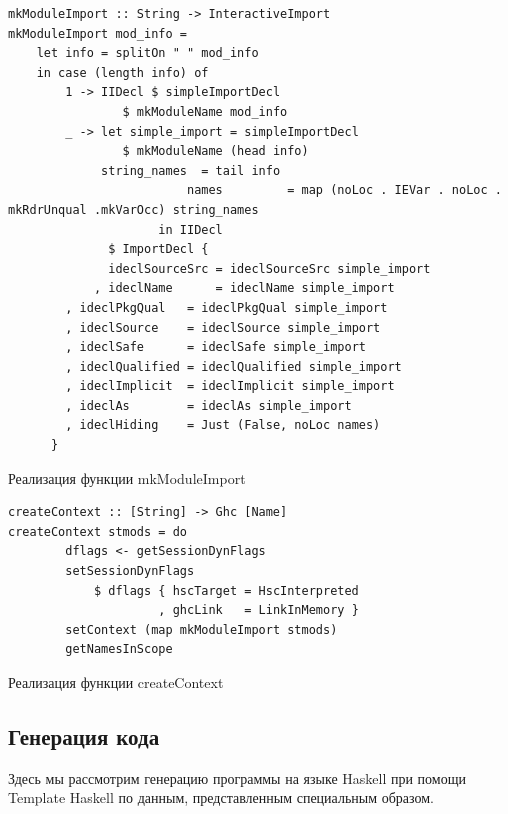		\begin{ListingEnv}[h]
		\begin{lstlisting}
mkModuleImport :: String -> InteractiveImport
mkModuleImport mod_info = 
	let info = splitOn " " mod_info
 	in case (length info) of
		1 -> IIDecl $ simpleImportDecl 
			    $ mkModuleName mod_info
		_ -> let simple_import = simpleImportDecl 
			    $ mkModuleName (head info)
			 string_names  = tail info
                         names         = map (noLoc . IEVar . noLoc . mkRdrUnqual .mkVarOcc) string_names
                     in IIDecl 
              $ ImportDecl { 
              ideclSourceSrc = ideclSourceSrc simple_import
            , ideclName      = ideclName simple_import
	    , ideclPkgQual   = ideclPkgQual simple_import
	    , ideclSource    = ideclSource simple_import
	    , ideclSafe      = ideclSafe simple_import
	    , ideclQualified = ideclQualified simple_import
	    , ideclImplicit  = ideclImplicit simple_import
	    , ideclAs        = ideclAs simple_import
	    , ideclHiding    = Just (False, noLoc names) 
	  }
		\end{lstlisting}
		\caption{Реализация функции mkModuleImport} \label{mkmod}
		\end{ListingEnv}
	
		\begin{ListingEnv}[h]
		\begin{lstlisting}
createContext :: [String] -> Ghc [Name]
createContext stmods = do
		dflags <- getSessionDynFlags
		setSessionDynFlags 
			$ dflags { hscTarget = HscInterpreted
			         , ghcLink   = LinkInMemory }
		setContext (map mkModuleImport stmods)
		getNamesInScope
		\end{lstlisting}
		\caption{Реализация функции createContext} \label{crcont}
		\end{ListingEnv}
		
	\subsection{Генерация кода}
	Здесь мы рассмотрим генерацию программы на языке Haskell при помощи Template Haskell по данным, представленным специальным образом.
